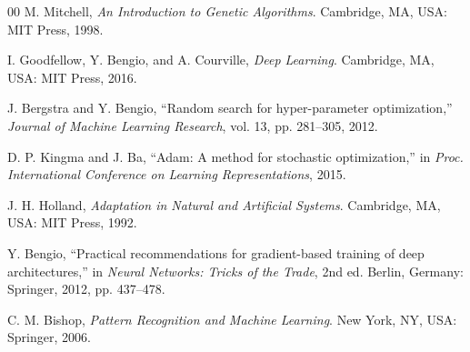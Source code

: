 \documentclass[conference]{IEEEtran}
\begin{document}
\begin{thebibliography}{00}
M. Mitchell, \textit{An Introduction to Genetic Algorithms}. Cambridge, MA, USA: MIT Press, 1998.

I. Goodfellow, Y. Bengio, and A. Courville, \textit{Deep Learning}. Cambridge, MA, USA: MIT Press, 2016.

J. Bergstra and Y. Bengio, ``Random search for hyper-parameter optimization,'' \textit{Journal of Machine Learning Research}, vol. 13, pp. 281--305, 2012.

D. P. Kingma and J. Ba, ``Adam: A method for stochastic optimization,'' in \textit{Proc. International Conference on Learning Representations}, 2015.

J. H. Holland, \textit{Adaptation in Natural and Artificial Systems}. Cambridge, MA, USA: MIT Press, 1992.

Y. Bengio, ``Practical recommendations for gradient-based training of deep architectures,'' in \textit{Neural Networks: Tricks of the Trade}, 2nd ed. Berlin, Germany: Springer, 2012, pp. 437--478.

C. M. Bishop, \textit{Pattern Recognition and Machine Learning}. New York, NY, USA: Springer, 2006.
\end{thebibliography}
\end{document}

